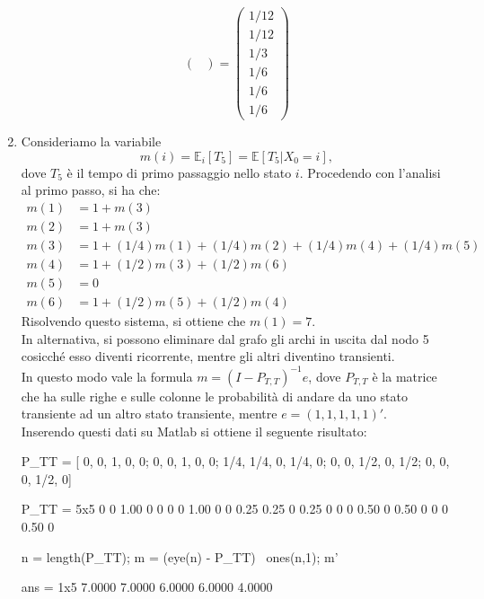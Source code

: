 \documentclass[
	12pt, %
]{fphw}
\begin{document}
\begin{enumerate}
\begin{equation*}
\begin{pmatrix}
		\end{pmatrix}
		=
		\begin{pmatrix}
			1/12 \\ 1/12 \\ 1/3 \\ 1/6 \\ 1/6 \\ 1/6
		\end{pmatrix}
	\end{equation*}
	\item Consideriamo la variabile
	\begin{equation*}
		m(i) = \mathbb{E}_i [T_5] = \mathbb{E}[T_5 | X_0 = i],
	\end{equation*}
	dove $T_5$ è il tempo di primo passaggio nello stato $i$.
	Procedendo con l'analisi al primo passo, si ha che:
	\begin{align*}
		m(1) &= 1 + m(3)\\
		m(2) &= 1 + m(3)\\
		m(3) &= 1 + (1/4)m(1) + (1/4)m(2) + (1/4)m(4) + (1/4)m(5)\\
		m(4) &= 1 + (1/2)m(3) + (1/2)m(6)\\
		m(5) &= 0\\
		m(6) &= 1 + (1/2)m(5) + (1/2)m(4)
	\end{align*}
	Risolvendo questo sistema, si ottiene che $m(1) = 7$.\\
	In alternativa, si possono eliminare dal grafo gli archi in uscita dal nodo 5 cosicché esso diventi ricorrente, mentre gli altri diventino transienti.\\
	In questo modo vale la formula $m = (I - P_{T,T})^{-1}e$,
	dove $P_{T,T}$ è la matrice che ha sulle righe e sulle colonne le probabilità di andare da uno stato transiente ad un altro stato transiente,
	mentre $e = (1, 1, 1, 1, 1)'$.\\
	Inserendo questi dati su Matlab si ottiene il seguente risultato:
	\begin{matlabcode}
		P_TT = [
			0, 0, 1, 0, 0;
			0, 0, 1, 0, 0;
			1/4, 1/4, 0, 1/4, 0;
			0, 0, 1/2, 0, 1/2;
			0, 0, 0, 1/2, 0]
		\end{matlabcode}
		\begin{matlaboutput}
		P_TT = 5x5    
				0         0      1.00      0      0
				0         0      1.00      0      0
				0.25      0.25   0         0.25   0
				0         0      0.50      0      0.50
				0         0      0         0.50   0
		
		\end{matlaboutput}
		\begin{matlabcode}
		n = length(P_TT);
		m = (eye(n) - P_TT) \ ones(n,1);
		m'
		\end{matlabcode}
		\begin{matlaboutput}
		ans = 1x5    
			7.0000    7.0000    6.0000    6.0000    4.0000
		

\end{matlaboutput}
\end{enumerate}
\end{document}
